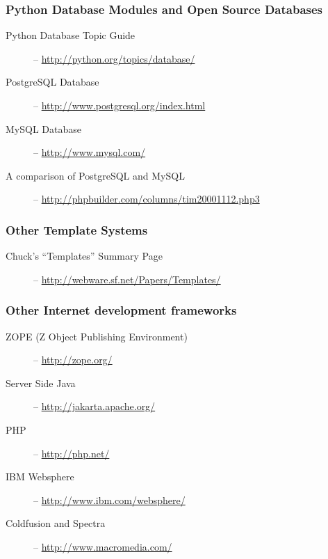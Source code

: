 \subsubsection{Python Database Modules and Open Source Databases}
\label{links.other}

\begin{description}
\item[Python Database Topic Guide] -- \url{http://python.org/topics/database/}
\item[PostgreSQL Database] -- \url{http://www.postgresql.org/index.html}
\item[MySQL Database] -- \url{http://www.mysql.com/}
\item[A comparison of PostgreSQL and MySQL] --
     \url{http://phpbuilder.com/columns/tim20001112.php3}
\end{description}

\subsubsection{Other Template Systems}
\label{links.other.templateSystems}

\begin{description}
\item[Chuck's ``Templates'' Summary Page] -- \url{http://webware.sf.net/Papers/Templates/}
\end{description}

\subsubsection{Other Internet development frameworks}
\label{links.other}

\begin{description}
\item[ZOPE (Z Object Publishing Environment)] -- \url{http://zope.org/}
\item[Server Side Java] -- \url{http://jakarta.apache.org/}
\item[PHP] -- \url{http://php.net/}
\item[IBM Websphere] -- \url{http://www.ibm.com/websphere/}
\item[Coldfusion and Spectra] -- \url{http://www.macromedia.com/}
\end{description}

